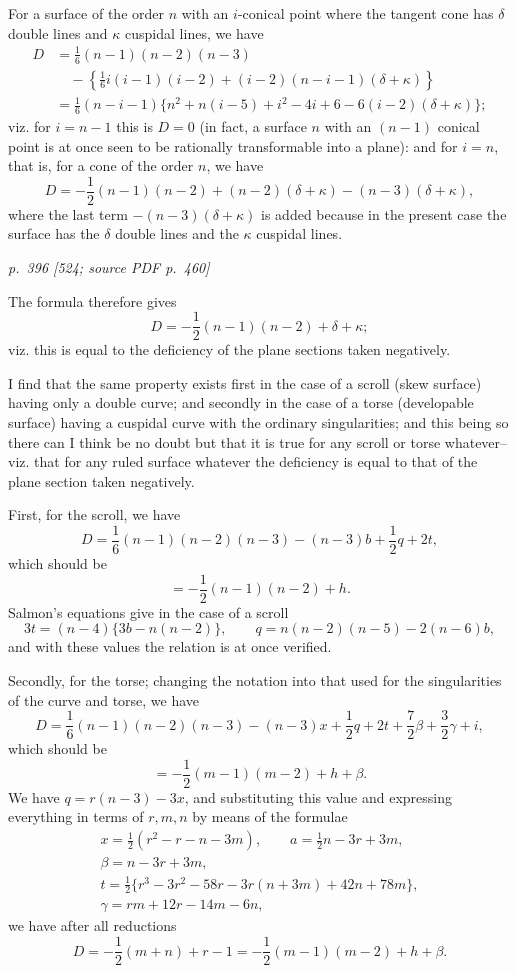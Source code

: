 \documentclass[11pt,a4paper]{article}
\newcommand{\pagemarker}[3]{\par\bigskip\noindent\textit{p.~#1 [#2; source PDF p.~#3]}\par\smallskip}
\begin{document}
For a surface of the order $n$ with an $i$-conical point where the tangent cone has
$\delta$ double lines and $\kappa$ cuspidal lines, we have
\[
\begin{aligned}
D&=\frac16(n-1)(n-2)(n-3)\\
&\quad-\left\{\frac16 i(i-1)(i-2)+(i-2)(n-i-1)(\delta+\kappa)\right\}\\
&=\frac16(n-i-1)\{n^2+n(i-5)+i^2-4i+6-6(i-2)(\delta+\kappa)\};
\end{aligned}
\]
viz. for $i=n-1$ this is $D=0$ (in fact, a surface $n$ with an $(n-1)$ conical point is
at once seen to be rationally transformable into a plane): and for $i=n$, that is, for
a cone of the order $n$, we have
\[
D=-\frac12(n-1)(n-2)+(n-2)(\delta+\kappa)-(n-3)(\delta+\kappa),
\]
where the last term $-(n-3)(\delta+\kappa)$ is added because in the present case the
surface has the $\delta$ double lines and the $\kappa$ cuspidal lines.

\pagemarker{396}{524}{460}

The formula therefore gives
\[
D=-\frac12(n-1)(n-2)+\delta+\kappa;
\]
viz. this is equal to the deficiency of the plane sections taken negatively.

I find that the same property exists first in the case of a scroll (skew surface)
having only a double curve; and secondly in the case of a torse (developable surface)
having a cuspidal curve with the ordinary singularities; and this being so there can
I think be no doubt but that it is true for any scroll or torse whatever--viz. that for
any ruled surface whatever the deficiency is equal to that of the plane section taken
negatively.

First, for the scroll, we have
\[
D=\frac16(n-1)(n-2)(n-3)-(n-3)b+\frac12q+2t,
\]
which should be
\[
=-\frac12(n-1)(n-2)+h.
\]
Salmon's equations give in the case of a scroll
\[
3t=(n-4)\{3b-n(n-2)\},\qquad
q=n(n-2)(n-5)-2(n-6)b,
\]
and with these values the relation is at once verified.

Secondly, for the torse; changing the notation into that used for the singularities of
the curve and torse, we have
\[
D=\frac16(n-1)(n-2)(n-3)-(n-3)x+\frac12q+2t+\frac72\beta+\frac32\gamma+i,
\]
which should be
\[
=-\frac12(m-1)(m-2)+h+\beta.
\]
We have $q=r(n-3)-3x$, and substituting this value and expressing everything in
terms of $r,m,n$ by means of the formulae
\[
\begin{gathered}
x=\frac12(r^2-r-n-3m),\qquad
a=\frac12 n-3r+3m,\\
\beta=n-3r+3m,\\
t=\frac12\{r^3-3r^2-58r-3r(n+3m)+42n+78m\},\\
\gamma=rm+12r-14m-6n,
\end{gathered}
\]
we have after all reductions
\[
D=-\frac12(m+n)+r-1=-\frac12(m-1)(m-2)+h+\beta.
\]
\end{document}
